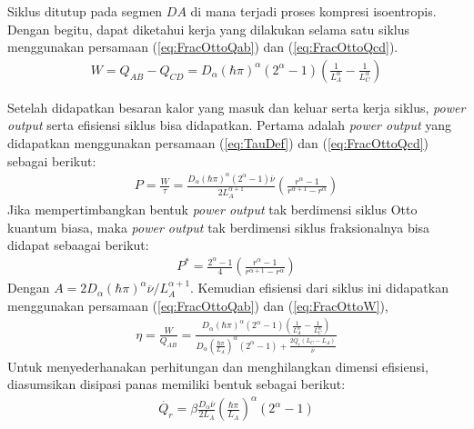 Siklus ditutup pada segmen \(DA\) di mana terjadi proses kompresi isoentropis. Dengan begitu, dapat diketahui kerja yang dilakukan selama satu siklus menggunakan persamaan (\ref{eq:FracOttoQab}) dan (\ref{eq:FracOttoQcd}).
\begin{align}
    W = Q_{AB} - Q_{CD} = D_\alpha(\hbar\pi)^\alpha (2^\alpha - 1)\left(\frac{1}{L_A^\alpha} - \frac{1}{L_C^\alpha}\right) \label{eq:FracOttoW}
\end{align}
\par Setelah didapatkan besaran kalor yang masuk dan keluar serta kerja siklus, \textit{power output} serta efisiensi siklus bisa didapatkan. Pertama adalah \textit{power output} yang didapatkan menggunakan persamaan (\ref{eq:TauDef}) dan (\ref{eq:FracOttoQcd}) sebagai berikut:
\begin{align}
    P = \frac{W}{\tau} = \frac{D_\alpha(\hbar\pi)^\alpha(2^\alpha - 1)\overline{\nu}}{2L_A^{\alpha+1}} \left( \frac{r^\alpha - 1}{r^{\alpha+1} - r^\alpha}\right) 
\end{align}
Jika mempertimbangkan bentuk \textit{power output} tak berdimensi siklus Otto kuantum biasa, maka \textit{power output} tak berdimensi siklus fraksionalnya bisa didapat sebaagai berikut:
\begin{align}
    P^* = \frac{2^\alpha - 1}{4}\left(\frac{r^\alpha - 1}{r^{\alpha+1} - r^\alpha}\right)
\end{align}
Dengan \(A=2D_\alpha(\hbar\pi)^\alpha\overline{\nu}/L_A^{\alpha+1}\). Kemudian efisiensi dari siklus ini didapatkan menggunakan persamaan (\ref{eq:FracOttoQab}) dan (\ref{eq:FracOttoW}),
\begin{align}
    \eta = \frac{W}{Q_{AB}} = \frac{D_\alpha(\hbar\pi)^\alpha (2^\alpha - 1)\left(\frac{1}{L_A^\alpha} - \frac{1}{L_C^\alpha}\right)}{D_\alpha\left(\frac{\hbar\pi}{L_A}\right)^\alpha (2^\alpha - 1) + \frac{2\dot{Q_r}(L_C-L_A)}{\overline{\nu}}}
\end{align}
Untuk menyederhanakan perhitungan dan menghilangkan dimensi efisiensi, diasumsikan disipasi panas memiliki bentuk sebagai berikut:
\begin{align}
    \dot{Q_r} = \beta \frac{D_\alpha\overline{\nu}}{2L_A}\left(\frac{\hbar\pi}{L_A}\right)^\alpha (2^\alpha - 1)
\end{align}
